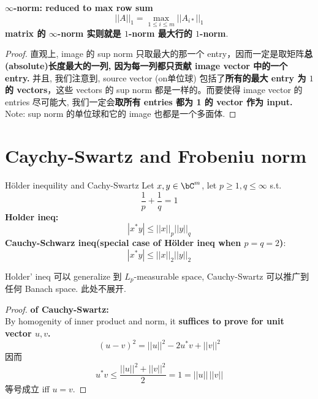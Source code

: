 \documentclass[lang=cn,11pt]{elegantbook}
\begin{document}
\begin{example}
\begin{proposition}{\textbf{$\infty$-norm: reduced to max row sum}}
    \begin{equation}
    ||A||_1 =  \max_{1 \leq i \leq m}  ||A_{i*}||_1
\end{equation}
\textbf{matrix 的 $\infty$-norm 实则就是 $1$-norm 最大行的 $1$-norm}.\\
\end{proposition}
\begin{proof}
直观上, image 的 sup norm 只取最大的那一个 entry，因而一定是取矩阵\textbf{总(absolute)长度最大的一列, 因为每一列都只贡献 image vector 中的一个 entry. }
并且, 我们注意到, source vector (on单位球) 包括了\textbf{所有的最大 entry 为 $1$ 的 vectors}，这些 vectors 的 sup norm 都是一样的。而要使得 image vector 的 entries 尽可能大, 我们一定会\textbf{取所有 entries 都为 1 的 vector 作为 input.}
Note: sup norm 的单位球和它的 image 也都是一个多面体.

\end{proof}

\end{example}




\section{Caychy-Swartz and Frobeniu norm}

\begin{theorem}{Hölder inequility and Cachy-Swartz}
Let $x,y \in \bC^m$, let $p\geq 1, q \leq \infty$ s.t. 
$$
\frac{1}{p} + \frac{1}{q} = 1
$$
\textbf{Holder ineq:}
\begin{equation}
    |x^*y| \leq ||x||_p ||y||_q
\end{equation}
\textbf{Cauchy-Schwarz ineq(special case of Hölder ineq when $p=q=2$)}:
\begin{equation}
    |x^*y| \leq ||x||_2 ||y||_2
\end{equation}

\end{theorem}
\begin{remark}
    Holder' ineq 可以 generalize 到 $L_p$-measurable space, Cauchy-Swartz 可以推广到任何 Banach space. 此处不展开.
\end{remark}
\begin{proof}
 \textbf{of Cauchy-Swartz:  } \\
 By homogenity of inner product and norm, it \textbf{suffices to prove for unit vector $u,v$.}\\
 $$(u-v)^2 = ||u||^2 -2u^* v + ||v||^2 $$
 因而
 $$
 u^*v \leq \frac{||u||^2 + ||v||^2}{2} = 1 = ||u|| \, ||v||
 $$
 等号成立 iff $u =v$.
\end{proof}
\end{document}
